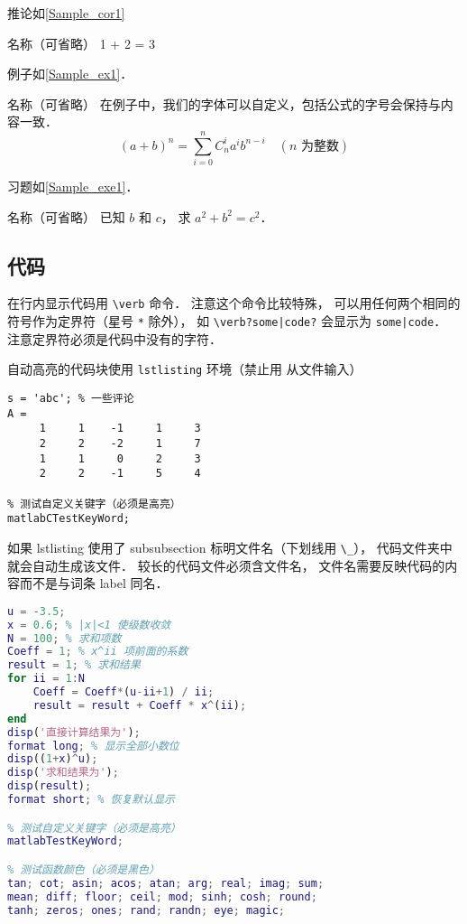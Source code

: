 推论如\autoref{Sample_cor1}
\begin{corollary}{名称（可省略）}\label{Sample_cor1}
1 + 2 = 3
\end{corollary}

例子如\autoref{Sample_ex1}． 
\begin{example}{名称（可省略）}\label{Sample_ex1}
在例子中，我们的字体可以自定义，包括公式的字号会保持与内容一致．
\begin{equation}
(a+b)^n = \sum_{i=0}^n C_n^i a^i b^{n-i} \quad (\text{$n$ 为整数})
\end{equation}
\end{example}

习题如\autoref{Sample_exe1}． 
\begin{exercise}{名称（可省略）}\label{Sample_exe1}
已知 $b$ 和 $c$， 求 $a^2 + b^2 = c^2$．
\end{exercise}

\subsection{代码}
在行内显示代码用 \verb|\verb| 命令． 注意这个命令比较特殊， 可以用任何两个相同的符号作为定界符（星号 \verb|*| 除外）， 如 \verb+\verb?some|code?+ 会显示为 \verb?some|code?． 注意定界符必须是代码中没有的字符．

自动高亮的代码块使用 \verb|lstlisting| 环境（禁止用 \verb|| 从文件输入）
\begin{lstlisting}[language=matlabC]
s = 'abc'; % 一些评论
A =
     1     1    -1     1     3
     2     2    -2     1     7
     1     1     0     2     3
     2     2    -1     5     4

% 测试自定义关键字（必须是高亮）
matlabCTestKeyWord;
\end{lstlisting}

如果 lstlisting 使用了 subsubsection 标明文件名（下划线用 \verb|\_|）， 代码文件夹中就会自动生成该文件． 较长的代码文件必须含文件名， 文件名需要反映代码的内容而不是与词条 label 同名．

\begin{lstlisting}[language=matlab, caption=sample\_code.m, label=Sample_lst1]
% 验证二项式定理(非整数幂)
u = -3.5;
x = 0.6; % |x|<1 使级数收敛
N = 100; % 求和项数
Coeff = 1; % x^ii 项前面的系数
result = 1; % 求和结果
for ii = 1:N
    Coeff = Coeff*(u-ii+1) / ii;
    result = result + Coeff * x^(ii);
end
disp('直接计算结果为');
format long; % 显示全部小数位
disp((1+x)^u);
disp('求和结果为');
disp(result);
format short; % 恢复默认显示

% 测试自定义关键字（必须是高亮）
matlabTestKeyWord;

% 测试函数颜色（必须是黑色）
tan; cot; asin; acos; atan; arg; real; imag; sum;
mean; diff; floor; ceil; mod; sinh; cosh; round;
tanh; zeros; ones; rand; randn; eye; magic;
\end{lstlisting}

